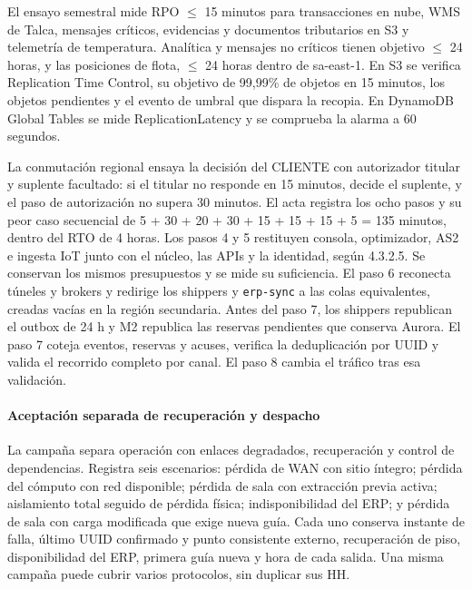 El ensayo semestral mide RPO $\leq$ 15 minutos para transacciones en nube, WMS de Talca, mensajes críticos, evidencias y documentos tributarios en S3 y telemetría de temperatura. Analítica y mensajes no críticos tienen objetivo $\leq$ 24 horas, y las posiciones de flota, $\leq$ 24 horas dentro de sa-east-1. En S3 se verifica Replication Time Control, su objetivo de 99,99\% de objetos en 15 minutos, los objetos pendientes y el evento de umbral que dispara la recopia. En DynamoDB Global Tables se mide ReplicationLatency y se comprueba la alarma a 60 segundos.

La conmutación regional ensaya la decisión del CLIENTE con autorizador titular y suplente facultado: si el titular no responde en 15 minutos, decide el suplente, y el paso de autorización no supera 30 minutos. El acta registra los ocho pasos y su peor caso secuencial de 5 + 30 + 20 + 30 + 15 + 15 + 15 + 5 = 135 minutos, dentro del RTO de 4 horas. Los pasos 4 y 5 restituyen consola, optimizador, AS2 e ingesta IoT junto con el núcleo, las APIs y la identidad, según 4.3.2.5. Se conservan los mismos presupuestos y se mide su suficiencia. El paso 6 reconecta túneles y brokers y redirige los shippers y \texttt{erp-sync} a las colas equivalentes, creadas vacías en la región secundaria. Antes del paso 7, los shippers republican el outbox de 24 h y M2 republica las reservas pendientes que conserva Aurora. El paso 7 coteja eventos, reservas y acuses, verifica la deduplicación por UUID y valida el recorrido completo por canal. El paso 8 cambia el tráfico tras esa validación.

\paragraph{Aceptación separada de recuperación y despacho}
La campaña separa operación con enlaces degradados, recuperación y control de dependencias. Registra seis escenarios: pérdida de WAN con sitio íntegro; pérdida del cómputo con red disponible; pérdida de sala con extracción previa activa; aislamiento total seguido de pérdida física; indisponibilidad del ERP; y pérdida de sala con carga modificada que exige nueva guía. Cada uno conserva instante de falla, último UUID confirmado y punto consistente externo, recuperación de piso, disponibilidad del ERP, primera guía nueva y hora de cada salida. Una misma campaña puede cubrir varios protocolos, sin duplicar sus HH.

